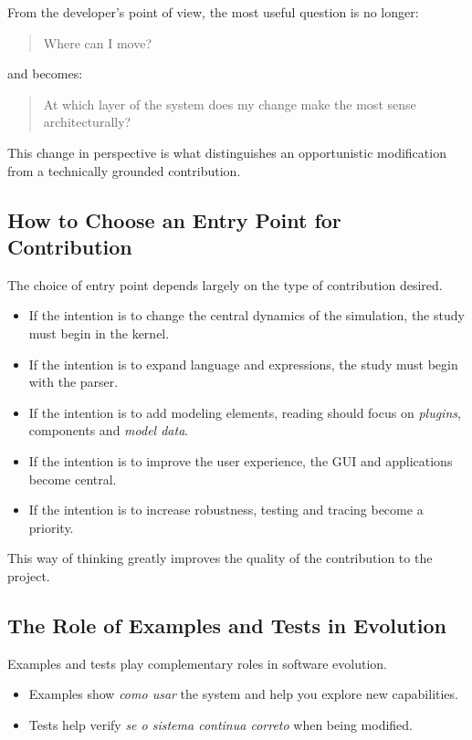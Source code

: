 From the developer's point of view, the most useful question is no longer:
\begin{quote}
 Where can I move?
\end{quote}
and becomes:
\begin{quote}
 At which layer of the system does my change make the most sense architecturally?
\end{quote}

This change in perspective is what distinguishes an opportunistic modification from a technically grounded contribution.

\subsection{How to Choose an Entry Point for Contribution}
\label{subsec:cap10_como_escolher_ponto_entrada}

The choice of entry point depends largely on the type of contribution desired.

\begin{itemize}
 \item If the intention is to change the central dynamics of the simulation, the study must begin in the kernel.
 \item If the intention is to expand language and expressions, the study must begin with the parser.
 \item If the intention is to add modeling elements, reading should focus on \textit{plugins}, components and \textit{model data}.
 \item If the intention is to improve the user experience, the GUI and applications become central.
 \item If the intention is to increase robustness, testing and tracing become a priority.
\end{itemize}

This way of thinking greatly improves the quality of the contribution to the project.

\subsection{The Role of Examples and Tests in Evolution}
\label{subsec:cap10_papel_exemplos_testes_evolucao}

Examples and tests play complementary roles in software evolution.

\begin{itemize}
 \item Examples show \emph{como usar} the system and help you explore new capabilities.
 \item Tests help verify \emph{se o sistema continua correto} when being modified.
\end{itemize}

